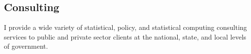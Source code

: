 \documentclass[margin,line]{res}
\begin{document}
\begin{resume}













\section{\sc Consulting}

I provide a wide variety of statistical, policy, and statistical computing 
consulting services to public and private sector clients at the national, state, 
and local levels of government. 


\end{resume}
\end{document}

